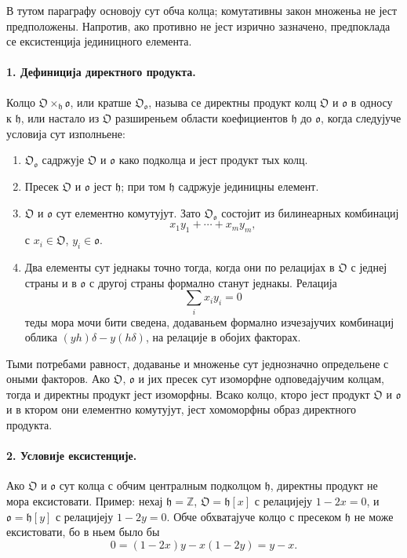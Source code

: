 ﻿\documentclass[11pt]{article}
\begin{document}
В тутом параграфу основоју сут обча колца; комутативны закон множеньа не јест предположены. Напротив, ако противно не јест изрично зазначено, предпоклада се ексистенција јединицного елемента.

\paragraph{1. Дефиниција директного продукта.}
Колцо \(\mathfrak O\times_{\mathfrak h}\mathfrak o\), или кратше \(\mathfrak O_{\mathfrak o}\), называ се директны продукт колц \(\mathfrak O\) и \(\mathfrak o\) в односу к \(\mathfrak h\), или настало из \(\mathfrak O\) разширеньем области коефициентов \(\mathfrak h\) до \(\mathfrak o\), когда следујуче условија сут изполньене:

\begin{enumerate}
\item \(\mathfrak O_{\mathfrak o}\) садржује \(\mathfrak O\) и \(\mathfrak o\) како подколца и јест продукт тых колц.
\item Пресек \(\mathfrak O\) и \(\mathfrak o\) јест \(\mathfrak h\); при том \(\mathfrak h\) садржује јединицны елемент.
\item \(\mathfrak O\) и \(\mathfrak o\) сут елементно комутујут. Зато \(\mathfrak O_{\mathfrak o}\) состојит из билинеарных комбинациј
\[
        x_1y_1+\cdots+x_my_m,
\]
с \(x_i\in\mathfrak O\), \(y_i\in\mathfrak o\).
\item Два елементы сут једнакы точно тогда, когда они по релацијах в \(\mathfrak O\) с једнеј страны и в \(\mathfrak o\) с другој страны формално станут једнакы. Релација
\[
        \sum_i x_i y_i=0
\]
теды мора мочи бити сведена, додаваньем формално изчезајучих комбинациј облика \((yh)\delta-y(h\delta)\), на релације в обојих факторах.
\end{enumerate}

Тыми потребами равност, додаванье и множенье сут једнозначно определьене с оными факторов. Ако \(\mathfrak O\), \(\mathfrak o\) и јих пресек сут изоморфне одповедајучим колцам, тогда и директны продукт јест изоморфны. Всако колцо, кторо јест продукт \(\mathfrak O\) и \(\mathfrak o\) и в ктором они елементно комутујут, јест хомоморфны образ директного продукта.

\paragraph{2. Условије ексистенције.}
Ако \(\mathfrak O\) и \(\mathfrak o\) сут колца с обчим централным подколцом \(\mathfrak h\), директны продукт не мора ексистовати. Пример: нехај \(\mathfrak h=\mathbb Z\), \(\mathfrak O=\mathfrak h[x]\) с релацијеју \(1-2x=0\), и \(\mathfrak o=\mathfrak h[y]\) с релацијеју \(1-2y=0\). Обче обхватајуче колцо с пресеком \(\mathfrak h\) не може ексистовати, бо в ньем было бы
\[
        0=(1-2x)y-x(1-2y)=y-x.
\]
\end{document}
